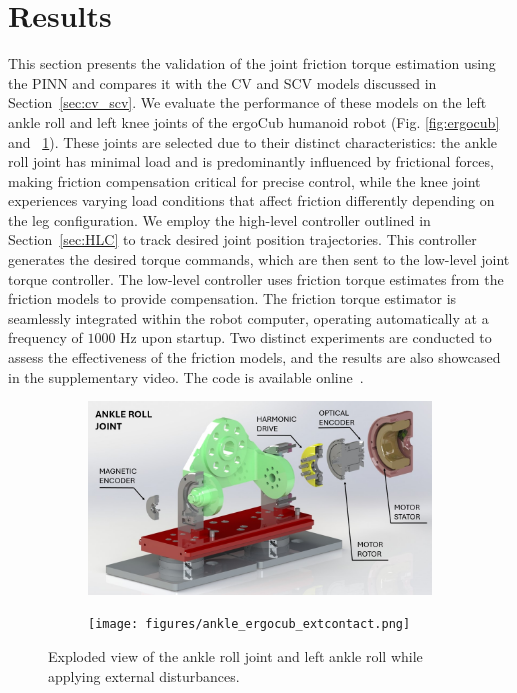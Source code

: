 \section{Results}
\label{sec:results}

This section presents the validation of the joint friction torque estimation using the PINN and compares it with the CV and SCV models discussed in Section~\ref{sec:cv_scv}. We evaluate the performance of these models on the left ankle roll and left knee joints of the ergoCub humanoid robot (Fig. \ref{fig:ergocub} and ~\ref{fig:ankleext}). These joints are selected due to their distinct characteristics: the ankle roll joint has minimal load and is predominantly influenced by frictional forces, making friction compensation critical for precise control, while the knee joint experiences varying load conditions that affect friction differently depending on the leg configuration. We employ the high-level controller outlined in Section~\ref{sec:HLC} to track desired joint position trajectories. This controller generates the desired torque commands, which are then sent to the low-level joint torque controller. The low-level controller uses friction torque estimates from the friction models to provide compensation. The friction torque estimator is seamlessly integrated within the robot computer, operating automatically at a frequency of $1000$ Hz upon startup. Two distinct experiments are conducted to assess the effectiveness of the friction models, and the results are also showcased in the supplementary video. The code is available online~\cite{code}.

\begin{figure}[t]
\centering
\begin{subfigure}{.98\columnwidth}
  \includegraphics[width=\textwidth]{figures/ankleroll.jpg}
\end{subfigure}%
\vspace{5pt} %
\begin{subfigure}{.98\columnwidth}
  \texttt{[image: figures/ankle\_ergocub\_extcontact.png]}
\end{subfigure}
\caption{Exploded view of the ankle roll joint and left ankle roll while applying external disturbances.}
\label{fig:ankleext}
\vspace{-15pt}
\end{figure}

